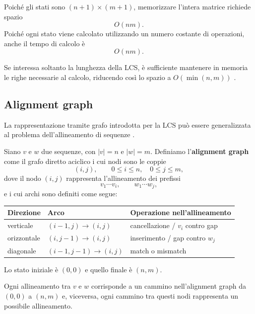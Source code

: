 Poiché gli stati sono $(n+1) \times(m+1)$, memorizzare l'intera matrice richiede spazio
\[
    O(nm).
\]
Poiché ogni stato viene calcolato utilizzando un numero costante di operazioni, anche il tempo di calcolo è
\[
    O(nm).
\]

Se interessa soltanto la lunghezza della LCS, è sufficiente mantenere in memoria le righe necessarie al calcolo,
riducendo così lo spazio a $O(\min(n,m))$ \cite[p.~230]{jones--pevzner}.

\subsection{Alignment graph}

La rappresentazione tramite grafo introdotta per la LCS può essere generalizzata al problema dell'allineamento di sequenze
\cite[pp.~167--177]{jones--pevzner}.

Siano $v$ e $w$ due sequenze, con $|v| = n$ e $|w| = m$.
Definiamo l'\textbf{alignment graph} come il grafo diretto aciclico i cui nodi sono le coppie
\[
    (i,j), \qquad 0 \leq i \leq n, \quad 0 \leq j \leq m,
\]
dove il nodo $(i,j)$ rappresenta l'allineamento dei prefissi
\[
    v_{1} \cdots v_{i}, \qquad w_{1}\cdots w_{j},
\]
e i cui archi sono definiti come segue:
\begin{center}
    \begin{tabular}{lll}
        \toprule
        Direzione & Arco & Operazione nell'allineamento\\
        \midrule
        verticale & $(i-1,j)\to(i,j)$ & cancellazione / $v_i$ contro gap\\
        orizzontale & $(i,j-1)\to(i,j)$ & inserimento / gap contro $w_j$\\
        diagonale & $(i-1,j-1)\to(i,j)$ & match o mismatch\\
        \bottomrule
    \end{tabular}
\end{center}


Lo stato iniziale è $(0,0)$ e quello finale è $(n,m)$.

Ogni allineamento tra $v$ e $w$ corrisponde a un cammino nell'alignment graph da $(0,0)$ a $(n,m)$ e, viceversa, ogni cammino tra questi nodi 
rappresenta un possibile allineamento.

